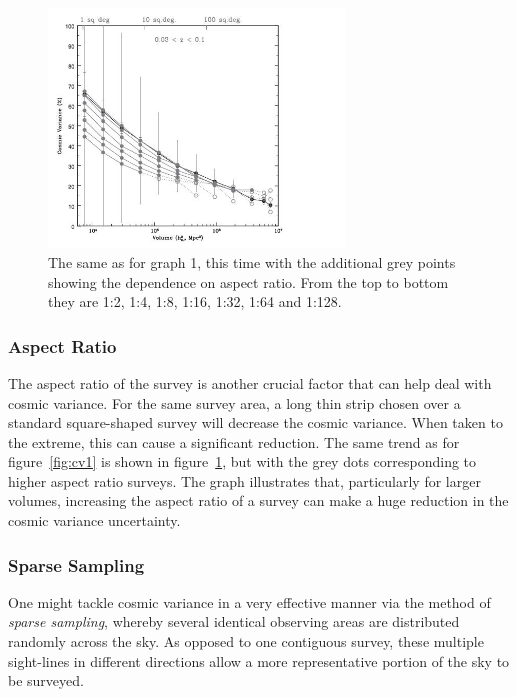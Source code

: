 			\begin{figure}
				\centering
				\includegraphics[width=0.7\textwidth]{../Images/cosmic_variance2.JPG}
				\caption{The same as for graph 1, this time with the additional grey points showing the dependence on aspect ratio. From the top to bottom they are 1:2, 1:4, 1:8, 1:16, 1:32, 1:64 and 1:128.}\label{fig:cv2}
			\end{figure}

		\subsubsection{Aspect Ratio} %
		\label{ssub:aspect_ratio}
			The aspect ratio of the survey is another crucial factor that can help deal with cosmic variance. For the same survey area, a long thin strip chosen over a standard square-shaped survey will decrease the cosmic variance. When taken to the extreme, this can cause a significant reduction. The same trend as for figure~\ref{fig:cv1} is shown in figure~\ref{fig:cv2}, but with the grey dots corresponding to higher aspect ratio surveys. The graph illustrates that, particularly for larger volumes, increasing the aspect ratio of a survey can make a huge reduction in the cosmic variance uncertainty.

		\subsubsection{Sparse Sampling} %
		\label{ssub:sparse_sampling}
			One might tackle cosmic variance in a very effective manner via the method of \emph{sparse sampling}, whereby several identical observing areas are distributed randomly across the sky. As opposed to one contiguous survey, these multiple sight-lines in different directions allow a more representative portion of the sky to be surveyed.

